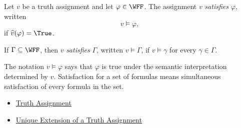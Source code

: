 \begin{tcolorbox}[colback=propbox, colframe=propborder, arc=2pt,
  left=6pt, right=6pt, top=4pt, bottom=4pt,
  title={\small\textbf{Definition (Satisfaction)}},
  fonttitle=\small\bfseries]
\label{def:satisfaction-propositional-logic}
Let $v$ be a truth assignment and let $\varphi\in\WFF$. The assignment
$v$ \emph{satisfies} $\varphi$, written
\[
v\models\varphi,
\]
if $\widehat v(\varphi)=\True$.

If $\Gamma\subseteq\WFF$, then $v$ \emph{satisfies} $\Gamma$, written
$v\models\Gamma$, if $v\models\gamma$ for every $\gamma\in\Gamma$.
\end{tcolorbox}

\begin{remark*}[Interpretation]
The notation $v\models\varphi$ says that $\varphi$ is true under the semantic
interpretation determined by $v$. Satisfaction for a set of formulas means
simultaneous satisfaction of every formula in the set.
\end{remark*}

\begin{dependencies}
\begin{itemize}
  \item \hyperref[def:truth-assignment-propositional-logic]{Truth Assignment}
  \item \hyperref[thm:unique-extension-truth-assignment-propositional-logic]{Unique Extension of a Truth Assignment}
\end{itemize}
\end{dependencies}
